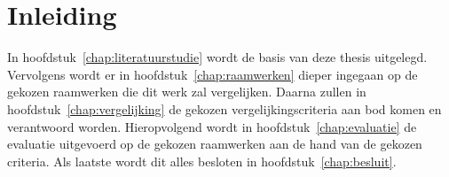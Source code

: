\chapter{Inleiding}
\label{inleiding}


In hoofdstuk~\ref{chap:literatuurstudie} wordt de basis van deze thesis uitgelegd.
Vervolgens wordt er in hoofdstuk~\ref{chap:raamwerken} dieper ingegaan op de gekozen raamwerken die dit werk zal vergelijken.
Daarna zullen in hoofdstuk~\ref{chap:vergelijking} de gekozen vergelijkingscriteria aan bod komen en verantwoord worden.
Hieropvolgend wordt in hoofdstuk~\ref{chap:evaluatie} de evaluatie uitgevoerd op de gekozen raamwerken aan de hand van de gekozen criteria.
Als laatste wordt dit alles besloten in hoofdstuk~\ref{chap:besluit}.

